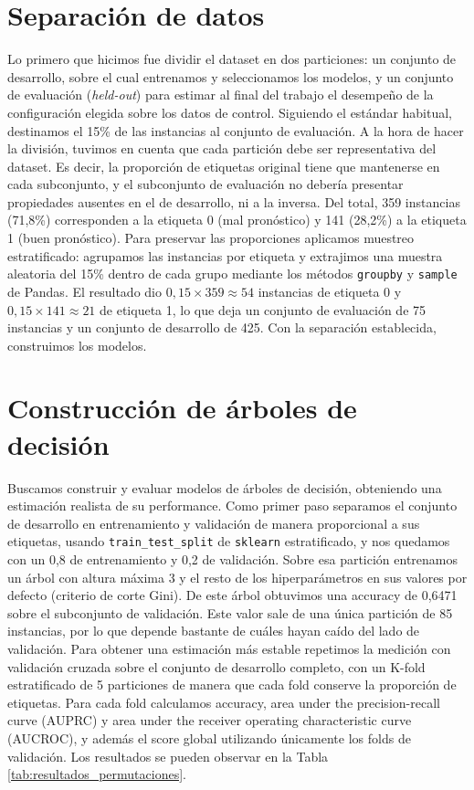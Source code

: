 \documentclass[10pt,a4paper]{article}
\begin{document}
\section{Separación de datos}
Lo primero que hicimos fue dividir el dataset en dos particiones: un conjunto de desarrollo, sobre el cual entrenamos y seleccionamos los modelos, y un conjunto de evaluación (\textit{held-out}) para estimar al final del trabajo el desempeño de la configuración elegida sobre los datos de control. Siguiendo el estándar habitual, destinamos el 15\% de las instancias al conjunto de evaluación. A la hora de hacer la división, tuvimos en cuenta que cada partición debe ser representativa del dataset. Es decir, la proporción de etiquetas original tiene que mantenerse en cada subconjunto, y el subconjunto de evaluación no debería presentar propiedades ausentes en el de desarrollo, ni a la inversa. Del total, 359 instancias (71,8\%) corresponden a la etiqueta 0 (mal pronóstico) y 141 (28,2\%) a la etiqueta 1 (buen pronóstico). Para preservar las proporciones aplicamos muestreo estratificado: agrupamos las instancias por etiqueta y extrajimos una muestra aleatoria del 15\% dentro de cada grupo mediante los métodos \texttt{groupby} y \texttt{sample} de Pandas. El resultado dio $0{,}15 \times 359 \approx 54$ instancias de etiqueta 0 y $0{,}15 \times 141 \approx 21$ de etiqueta 1, lo que deja un conjunto de evaluación de 75 instancias y un conjunto de desarrollo de 425. Con la separación establecida, construimos los modelos.

\section{Construcción de árboles de decisión}
Buscamos construir y evaluar modelos de árboles de decisión, obteniendo una estimación realista de su performance. 
Como primer paso separamos el conjunto de desarrollo en entrenamiento y validación de manera proporcional a sus etiquetas, usando \texttt{train\_test\_split} de \texttt{sklearn} estratificado, y nos quedamos con un 0,8 de entrenamiento y 0,2 de validación.
Sobre esa partición entrenamos un árbol con altura máxima 3 y el resto de los hiperparámetros en sus valores por defecto (criterio de corte Gini). De este árbol obtuvimos una accuracy de 0,6471 sobre el subconjunto de validación.
Este valor sale de una única partición de 85 instancias, por lo que depende bastante de cuáles hayan caído del lado de validación.
Para obtener una estimación más estable repetimos la medición con validación cruzada sobre el conjunto de desarrollo completo, con un K-fold estratificado de 5 particiones de manera que cada fold conserve la proporción de etiquetas.
Para cada fold calculamos accuracy, area under the precision-recall curve (AUPRC) y area under the receiver operating characteristic curve (AUCROC), y además el score global utilizando únicamente los folds de validación.
Los resultados se pueden observar en la Tabla \ref{tab:resultados_permutaciones}.
\end{document}
